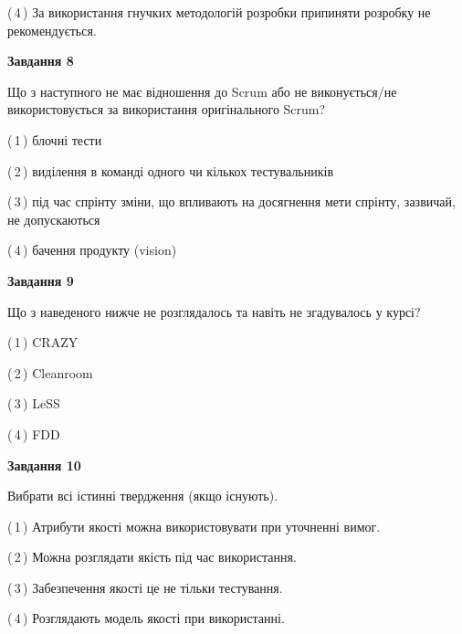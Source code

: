 \documentclass[10pt, ukrainian]{article}
\begin{document}
{\begin {large}
(\,4\,) За використання гнучких методологій розробки припиняти розробку не рекомендується. %


{\begin {center}\textbf{Завдання 8}\end {center}}\par
Що з наступного не має відношення до Scrum або не виконується/не використовується за використання оригінального Scrum?\par
\vspace{2mm}



(\,1\,) блочні тести%



(\,2\,) виділення в команді одного чи кількох тестувальників%



(\,3\,) під час спрінту зміни, що впливають на досягнення мети спрінту, зазвичай, не допускаються%



(\,4\,) бачення продукту (vision) %


{\begin {center}\textbf{Завдання 9}\end {center}}\par
Що з наведеного нижче не розглядалось та навіть не згадувалось у курсі?\par
\vspace{2mm}



(\,1\,) CRAZY%



(\,2\,) Cleanroom%



(\,3\,) LeSS%



(\,4\,) FDD%


{\begin {center}\textbf{Завдання 10}\end {center}}\par
Вибрати всі істинні твердження (якщо існують).\par
\vspace{2mm}



(\,1\,) Атрибути якості можна використовувати при уточненні вимог.%



(\,2\,) Можна розглядати якість під час використання.%



(\,3\,) Забезпечення якості це не тільки тестування.%



(\,4\,) Розглядають модель якості при використанні.%



\end {large}}
\end{document}
